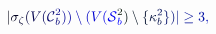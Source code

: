 \documentclass[12pt]{article}
\begin{document}
\makeatletter
\renewcommand*{\@textcolor}[3]{%
  \protect\leavevmode
  \begingroup
    \color#1{#2}#3%
  \endgroup
}
\makeatother
\begin{displaymath}
\mathcolor[RGB]{0,0,15}{|} \mathcolor[RGB]{0,0,30}{\sigma} _ { \mathcolor[RGB]{0,0,45}{\zeta} } \mathcolor[RGB]{0,0,60}{(} \mathcolor[RGB]{0,0,75}{V} \mathcolor[RGB]{0,0,90}{(} \mathcal { \mathcolor[RGB]{0,0,105}{C} } _ { \mathcolor[RGB]{0,0,120}{b} } ^ { \mathcolor[RGB]{0,0,135}{2} } \mathcolor[RGB]{0,0,150}{)} \mathcolor[RGB]{0,0,165}{)} \mathcolor[RGB]{0,0,180}{\setminus} \mathcolor[RGB]{0,0,195}{(} \mathcolor[RGB]{0,0,210}{V} \mathcolor[RGB]{0,0,225}{(} \mathcal { \mathcolor[RGB]{0,0,240}{S} } _ { \mathcolor[RGB]{0,0,255}{b} } ^ { \mathcolor[RGB]{0,15,0}{2} } \mathcolor[RGB]{0,15,15}{)} \mathcolor[RGB]{0,15,30}{\setminus} \mathcolor[RGB]{0,15,45}{\{} \mathcolor[RGB]{0,15,60}{\kappa} _ { \mathcolor[RGB]{0,15,75}{b} } ^ { \mathcolor[RGB]{0,15,90}{2} } \mathcolor[RGB]{0,15,105}{\}} \mathcolor[RGB]{0,15,120}{)} \mathcolor[RGB]{0,15,135}{|} \mathcolor[RGB]{0,15,150}{\geq} \mathcolor[RGB]{0,15,165}{3} \mathcolor[RGB]{0,15,180}{,}
\end{displaymath}
\end{document}
